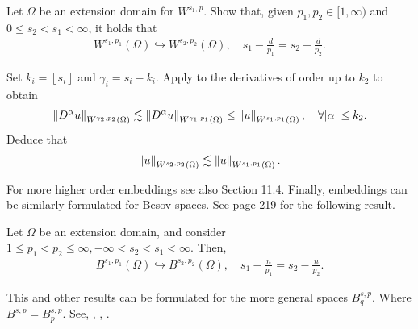 \documentclass[
    a4paper,
    DIV=14,
    abstract=true,
    numbers=noenddot
]{scrartcl}
\begin{document}
\begin{exercise}
    Let $\Omega $ be an extension domain for $W^{s_1,p}$. Show that, given $p_1, p_2 \in [1,\infty)$ and $0 \leq s_2<s_1 <\infty$, it holds that
    \begin{align*}
        W^{s_1, p_1}(\Omega ) \hookrightarrow W^{s_2, p_2}(\Omega ), \quad s_1 - \frac{d}{p_1} = s_2 - \frac{d}{p_2}.
    \end{align*}
\end{exercise}
\begin{hint}
    Set $k_i =\left\lfloor s_i \right\rfloor$ and $\gamma_i =s_i-k_i$.  Apply  to the derivatives of order up to $k_2$ to obtain
    \begin{align*}
        \left\lVert D^\alpha u \right\rVert_{W^{\gamma_2, p_2}(\Omega )}\lesssim \left\lVert D^\alpha u \right\rVert_{W^{\gamma _1,p_1}(\Omega )} \leq \left\lVert u \right\rVert_{W^{s_1,p_1}(\Omega )}, \quad \forall {\left| \alpha \right|}\leq k_2.
    \end{align*}
    Deduce that
    \begin{align*}
        \left\lVert u \right\rVert_{W^{s_2,p_2}(\Omega )}\lesssim \left\lVert u \right\rVert_{W^{s_1,p_1}(\Omega )}.
    \end{align*}
\end{hint}
For more higher order embeddings see also \cite{leoni2023first} Section 11.4. Finally, embeddings can be similarly formulated for Besov spaces. See \cite{sawano2018theory} page 219 for the following result.

\begin{theorem} Let $\Omega $ be an extension domain, and consider $1 \leq p_1<p_2 \leq \infty, - \infty <s_2<s_1<\infty$. Then,
    \begin{align*}
        B^{s_1,p_1}(\Omega) \hookrightarrow B^{s_2,p_2}(\Omega), \quad s_1-\frac{n}{p_1}=s_2-\frac{n}{p_2} .
    \end{align*}
\end{theorem}
This and other results can be formulated for the more general spaces $B^{s,p}_q$. Where $B^{s,p}= B^{s,p}_p$. See, \cite{triebel1992theory}, \cite{agranovich2015sobolev}, \cite{sawano2018theory}.
\end{document}
